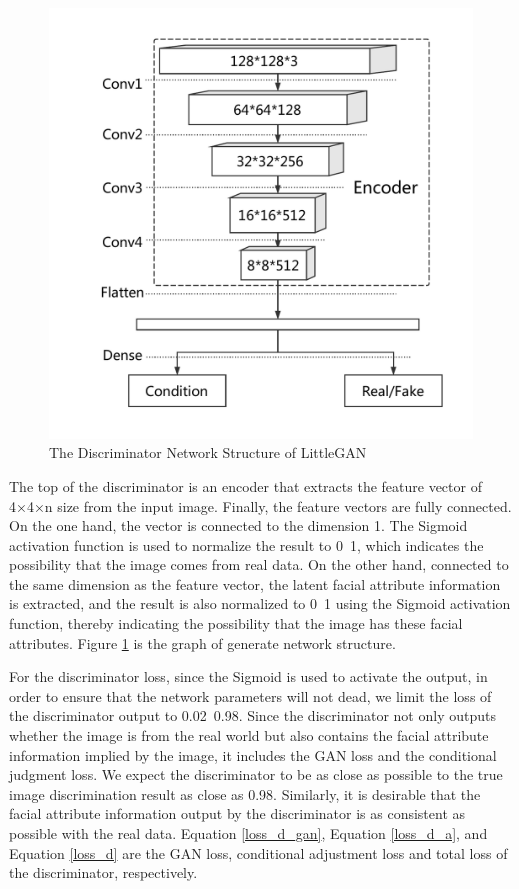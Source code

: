 \begin{figure}
\begin{minipage}[t]{0.48\linewidth}
        \includegraphics[width=\textwidth]{figures/net_discriminator.pdf}
        \caption{The Discriminator Network Structure of LittleGAN}
        \label{net_discriminator}
    \end{minipage}
\end{figure}

The top of the discriminator is an encoder that extracts the feature vector of 4×4×n size from the input image.
Finally, the feature vectors are fully connected.
On the one hand, the vector is connected to the dimension 1.
The Sigmoid activation function is used to normalize the result to 0~1,
    which indicates the possibility that the image comes from real data.
On the other hand, connected to the same dimension as the feature vector,
    the latent facial attribute information is extracted,
    and the result is also normalized to 0~1 using the Sigmoid activation function,
    thereby indicating the possibility that the image has these facial attributes.
Figure \ref{net_discriminator} is the graph of generate network structure.


For the discriminator loss, since the Sigmoid is used to activate the output,
    in order to ensure that the network parameters will not dead,
    we limit the loss of the discriminator output to 0.02~0.98.
Since the discriminator not only outputs whether the image is from the real world but also contains the facial attribute information implied by the image,
    it includes the GAN loss and the conditional judgment loss.
We expect the discriminator to be as close as possible to the true image discrimination result as close as 0.98.
Similarly, it is desirable that the facial attribute information output by the discriminator is as consistent as possible with the real data.
Equation \eqref{loss_d_gan}, Equation \eqref{loss_d_a}, and Equation \eqref{loss_d} are the GAN loss, conditional adjustment loss and total loss of the discriminator, respectively.


